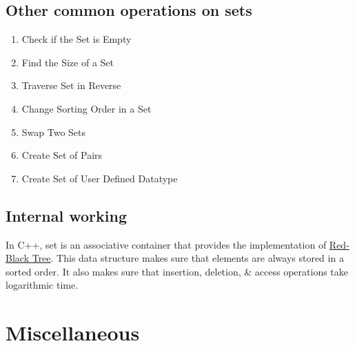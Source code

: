 \documentclass{article}
\begin{document}

\subsection{Other common operations on sets}
\begin{enumerate}
	\item Check if the Set is Empty
	\item Find the Size of a Set
	\item Traverse Set in Reverse
	\item Change Sorting Order in a Set
	\item Swap Two Sets
	\item Create Set of Pairs
	\item Create Set of User Defined Datatype
\end{enumerate}


\subsection{Internal working}
In C++, set is an associative container that provides the implementation of \href{https://www.geeksforgeeks.org/red-black-tree-in-cpp/}{Red-Black Tree}. This data structure makes sure that elements are always stored in a sorted order. It also makes sure that insertion, deletion, \& access operations take logarithmic time.



\section{Miscellaneous}


\printbibliography[heading=bibintoc]
	
\end{document}
